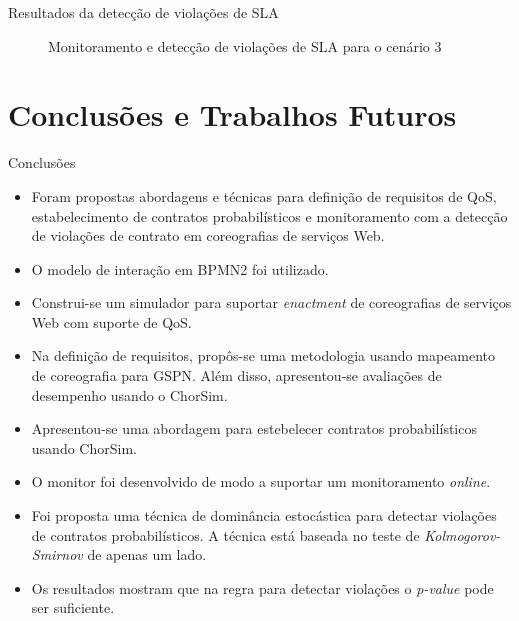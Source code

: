 \documentclass[xcolor=svgnames]{beamer}
\begin{document}
\begin{frame}{Resultados da detecção de violações de SLA}
{\begin{figure}[H]
	  \caption{ Monitoramento e detecção de violações de SLA para o cenário 3 }
	  \label{figure:detection4-105_10_105}
      \end{figure}
    }

  \end{frame}
  


\section{Conclusões e Trabalhos Futuros}
  \begin{frame}{Conclusões}
      \begin{itemize}
	\item Foram propostas  abordagens e técnicas para definição de requisitos de QoS, estabelecimento de contratos probabilísticos
	e monitoramento com a detecção de violações de contrato em coreografias de serviços Web.
	\item O modelo de interação em BPMN2 foi utilizado.
	\item Construi-se um simulador para suportar \textit{enactment} de coreografias de serviços Web com suporte de QoS.
	\item Na definição de requisitos, propôs-se uma metodologia usando mapeamento de coreografia para GSPN. Além disso, 
	apresentou-se avaliações de desempenho usando o ChorSim.
	\item Apresentou-se uma abordagem para estebelecer contratos probabilísticos usando ChorSim.
	\item O monitor foi desenvolvido de modo a suportar um monitoramento \textit{online}.
	\item Foi proposta uma técnica de dominância estocástica para detectar violações de contratos probabilísticos. 
	  A técnica está baseada no teste de \textit{Kolmogorov-Smirnov} de apenas um lado.
	\item Os resultados mostram que na regra para detectar violações o \textit{p-value} pode ser suficiente.
      \end{itemize}

  \end{frame}
\end{document}
